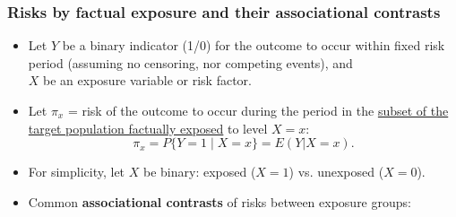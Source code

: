\documentclass[12pt,dvipsnames,t,aspectratio=169, handout%
]{beamer}
\begin{document}
\begin{frame}
\frametitle{\large Risks by factual exposure and their associational contrasts}
 
\begin{itemize}
\item
Let %
 $Y$ %
 be a binary indicator (1/0)
for the outcome to occur within fixed risk period (assuming no censoring, nor competing events), 
and \\ $X$ be an exposure variable or risk factor. 
\pause
\medskip
\item
Let $\pi_x$ = risk of the outcome to occur during the period in the
\underline{subset of the target population factually exposed} to level $X=x$:
$$ \pi_x = P \{ Y=1\mid X=x\} = E(Y|X=x) . $$
\pause
\item
For simplicity, let $X$ be binary: exposed ($X=1$) vs. unexposed ($X=0$). %
\pause
\medskip
\item
Common \textbf{associational contrasts}
of risks  between exposure groups:
\medskip
{}
\end{itemize}
\end{frame}
\end{document}
